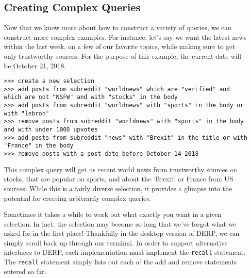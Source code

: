 \subsection{Creating Complex Queries}

Now that we know more about how to construct a variety of queries, we can construct more complex examples. For instance, let’s say we want the latest news within the last week, on a few of our favorite topics, while making sure to get only trustworthy sources. For the purpose of this example, the current date will be October 21, 2018.
\newline\begin{minipage}{\linewidth}\begin{lstlisting}
>>> create a new selection
>>> add posts from subreddit "worldnews" which are "verified" and which are not "NSFW" and with "stocks" in the body
>>> add posts from subreddit "worldnews" with "sports" in the body or with "lebron"
>>> remove posts from subreddit "worldnews" with "sports" in the body and with under 1000 upvotes
>>> add posts from subreddit "news" with "Brexit" in the title or with "France" in the body
>>> remove posts with a post date before October 14 2018
\end{lstlisting}\end{minipage}
This complex query will get us recent world news from trustworthy sources on stocks, that are popular on sports, and about the ‘Brexit’ or France from US sources. While this is a fairly diverse selection, it provides a glimpse into the potential for creating arbitrarily complex queries.

Sometimes it takes a while to work out what exactly you want in a given selection. In fact, the selection may become so long that we’ve forgot what we asked for in the first place! Thankfully in the desktop version of DERP, we can simply scroll back up through our terminal. In order to support alternative interfaces to DERP, each implementation must implement the \texttt{recall} statement. The \texttt{recall} statement simply lists out each of the add and remove statements entered so far.
